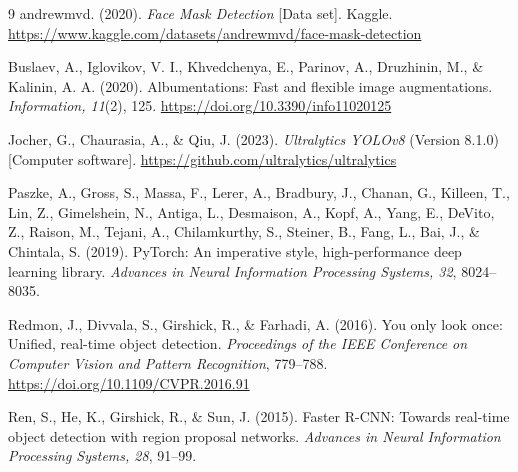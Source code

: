 \documentclass[12pt]{article}
\begin{document}
\begin{thebibliography}{9}
 andrewmvd. (2020). \textit{Face Mask Detection} [Data set].
    Kaggle. \url{https://www.kaggle.com/datasets/andrewmvd/face-mask-detection}

 Buslaev, A., Iglovikov, V. I., Khvedchenya, E., Parinov, A.,
    Druzhinin, M., \& Kalinin, A. A. (2020). Albumentations: Fast and
    flexible image augmentations. \textit{Information, 11}(2), 125.
    \url{https://doi.org/10.3390/info11020125}

 Jocher, G., Chaurasia, A., \& Qiu, J. (2023). \textit{Ultralytics
    YOLOv8} (Version 8.1.0) [Computer software].
    \url{https://github.com/ultralytics/ultralytics}

 Paszke, A., Gross, S., Massa, F., Lerer, A., Bradbury, J.,
    Chanan, G., Killeen, T., Lin, Z., Gimelshein, N., Antiga, L.,
    Desmaison, A., Kopf, A., Yang, E., DeVito, Z., Raison, M.,
    Tejani, A., Chilamkurthy, S., Steiner, B., Fang, L., Bai, J., \&
    Chintala, S. (2019). PyTorch: An imperative style, high-performance
    deep learning library. \textit{Advances in Neural Information
    Processing Systems, 32}, 8024--8035.

 Redmon, J., Divvala, S., Girshick, R., \& Farhadi, A. (2016). You
    only look once: Unified, real-time object detection.
    \textit{Proceedings of the IEEE Conference on Computer Vision and
    Pattern Recognition}, 779--788. \url{https://doi.org/10.1109/CVPR.2016.91}

 Ren, S., He, K., Girshick, R., \& Sun, J. (2015). Faster R-CNN:
    Towards real-time object detection with region proposal networks.
    \textit{Advances in Neural Information Processing Systems, 28}, 91--99.
\end{thebibliography}
\end{document}
